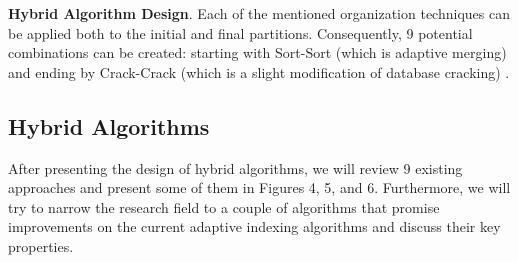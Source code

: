 \documentclass[10pt, conference, compsocconf]{IEEEtran}
\begin{document}
\textbf{Hybrid Algorithm Design}. Each of the mentioned organization techniques can be applied both to the initial and final partitions. Consequently, 9 potential combinations can be created: starting with Sort-Sort (which is adaptive merging) and ending by Crack-Crack (which is a slight modification of database cracking) \cite{hybrid}.

\subsection{Hybrid Algorithms}
\label{subsec:hybrid_algo}
After presenting the design of hybrid algorithms, we will review 9 existing approaches and present some of them in Figures 4, 5, and 6. Furthermore, we will try to narrow the research field to a couple of algorithms that promise improvements on the current adaptive indexing algorithms and discuss their key properties.
\end{document}
